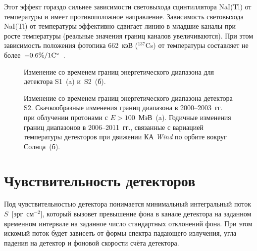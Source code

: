Этот эффект гораздо сильнее зависимости световыхода сцинтиллятора NaI(Tl) 
от температуры и имеет противоположное направление. Зависимость световыхода NaI(Tl) от 
температуры эффективно сдвигает линию в младшие каналы при росте температуры 
(реальные значения границ каналов увеличиваются). При этом зависимость положения 
фотопика 662~кэВ ($^{137}$Cs) от температуры составляет 
не более~$-0.6\textrm{\%}/1 {\mathrm{C}}^{\circ}$~\citep{Ianakiev_2009NIMP}.

\begin{figure}[h]
  \begin{minipage}[h]{0.5\textwidth}
  \end{minipage}
  \hfill
  \begin{minipage}[h]{0.5\textwidth}
  \end{minipage}
  \caption[Изменение со временем границ энергетического диапазона для детектора S1 и~S2.]
  {Изменение со временем границ энергетического диапазона для детектора S1~(a) и~S2~(б).}
  \label{img:KW_E_boundaries}  
\end{figure}

\begin{figure}[h]
  \begin{minipage}[h]{0.5\textwidth}
  \end{minipage}
  \hfill
  \begin{minipage}[h]{0.5\textwidth}
  \end{minipage}
  \caption[Изменение со временем границ энергетического диапазона детектора S2 
  в 2000--2003~гг. и 2006--2011~гг.]
  {Изменение со временем границ энергетического диапазона детектора S2. 
  Скачкообразные изменения границ диапазона в 2000--2003~гг. при облучении протонами с $E>100$~МэВ~(a). 
  Годичные изменения границ диапазонов в 2006--2011~гг., связанные с вариацией температуры детекторов 
  при движении КА \textit{Wind} по орбите вокруг Солнца~(б).}
  \label{img:KW_E_boundaries_features}  
\end{figure}

\section{Чувствительность детекторов}
Под чувствительностью детектора понимается минимальный интегральный поток $S$~[эрг~см$^{-2}$], 
который вызовет превышение фона в канале детектора на заданном временном интервале 
на заданное число стандартных отклонений фона. При этом искомый поток будет зависеть 
от формы спектра падающего излучения, угла падения на детектор и фоновой скорости счёта детектора.

